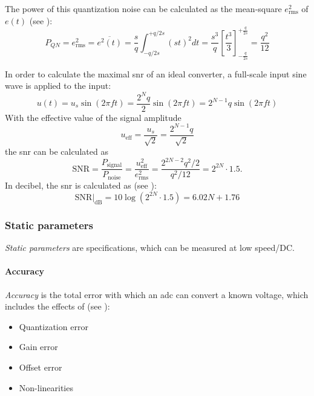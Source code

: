 The power of this quantization noise can be calculated as the mean-square $e_{\text{rms}}^2$ of $e(t)$ (see \cite{walt}):
\begin{equation}
	P_{QN} = e_{\text{rms}}^{2} = \overline{e^{2}(t)} = \frac{s}{q}\int_{-q/2s}^{+q/2s} (st)^{2} dt = \frac{s^3}{q} \left[ \frac{t^3}{3}\right]_{-\frac{q}{2s}}^{+\frac{q}{2s}} = \frac{q^2}{12}
\end{equation}

In order to calculate the maximal \gls{snr} of an ideal converter, a full-scale input sine wave is applied to the input:
\begin{equation}
	u(t) = u_s \sin(2\pi f t) = \frac{2^{N}q}{2}\sin(2\pi f t)  = 2^{N-1}q \sin(2\pi f t)
\end{equation}
With the effective value of the signal amplitude
\begin{equation}
	u_{\text{eff}} = \frac{u_s}{\sqrt{2}} = \frac{2^{N-1}q}{\sqrt{2}}
\end{equation}
the \gls{snr} can be calculated as 
\begin{equation}
	\text{SNR} = \frac{P_{\text{signal}}}{P_{\text{noise}}} = \frac{u_{\text{eff}}^{2}}{e_{\text{rms}}^{2}} = \frac{2^{2N-2}q^2/2}{q^2/12} = 2^{2N} \cdot 1.5.
\end{equation}
In decibel, the \gls{snr} is calculated as (see \cite{puente2015, walt}):
\begin{equation}\label{eq:idealSNR}
	\text{SNR}|_{\text{dB}} = 10\log\left(2^{2N}\cdot 1.5\right) = 6.02 N + 1.76
\end{equation}




\subsubsection{Static parameters}
\textit{Static parameters} are specifications, which can be measured at low speed/DC. 
\paragraph{Accuracy}
\textit{Accuracy} is the total error with which an \gls{adc} can convert a known voltage, which includes the effects of (see \cite{Lundberg}):
\begin{itemize}[noitemsep]
	\item Quantization error
	\item Gain error
	\item Offset error
	\item Non-linearities
\end{itemize}

